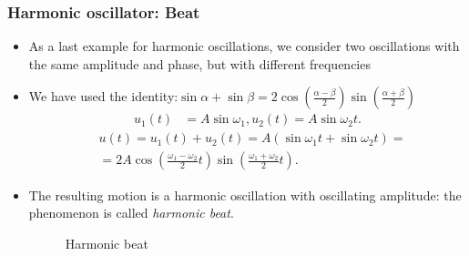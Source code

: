 \documentclass[t,aspectratio=169]{beamer}
\begin{document}
\begin{frame}
\frametitle{Harmonic oscillator: Beat}
\begin{itemize}
\item As a last example for harmonic oscillations, we consider two oscillations with the same amplitude and phase, but with different frequencies
\item We have used the identity:$\sin\alpha+\sin\beta=2\cos\left(\frac{\alpha-\beta}{2}\right)\sin\left(\frac{\alpha+\beta}{2}\right)$
\begin{align*}
u_{1}(t)&=A\sin\omega_{1}, u_{2}(t)=A\sin\omega_{2}t.
\end{align*}
\begin{align*}
&u(t)=u_{1}(t)+u_{2}(t)=A\left(\sin\omega_{1}t+\sin\omega_{2}t\right)=\\
&=2A\cos\left(\frac{\omega_{1}-\omega_{2}}{2}t\right)\sin\left(\frac{\omega_{1}+\omega_{2}}{2}t\right).
\end{align*}
\item The resulting motion is a harmonic oscillation with oscillating amplitude: the phenomenon is called \emph{harmonic beat}.

\pagebreak
\begin{center}
\begin{figure}
\caption{Harmonic beat}
\end{figure}
\end{center}

\end{itemize}
\end{frame}

\end{document}
